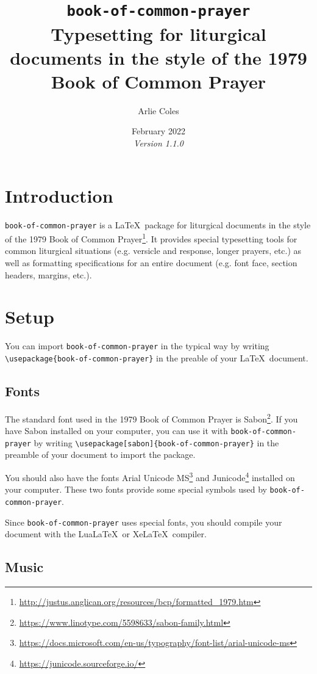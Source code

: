 \documentclass{article}
\title{\texttt{book-of-common-prayer}\\
	   \Large Typesetting for liturgical documents in the style of the 1979 Book of Common Prayer \\
	   }
\date{February 2022 \\ \textit{Version 1.1.0}}
\author{Arlie Coles}
\begin{document}
\maketitle

\tableofcontents

\clearpage
\section{Introduction}

\texttt{book-of-common-prayer} is a \LaTeX\ package for liturgical documents in the style of the 1979 Book of Common Prayer\footnote{\url{http://justus.anglican.org/resources/bcp/formatted_1979.htm}}. It provides special typesetting tools for common liturgical situations (e.g. versicle and response, longer prayers, etc.) as well as formatting specifications for an entire document (e.g. font face, section headers, margins, etc.).

\section{Setup}

You can import \texttt{book-of-common-prayer} in the typical way by writing \lstinline|\usepackage{book-of-common-prayer}| in the preable of your \LaTeX\ document.

\subsection{Fonts}

The standard font used in the 1979 Book of Common Prayer is Sabon\footnote{\url{https://www.linotype.com/5598633/sabon-family.html}}. If you have Sabon installed on your computer, you can use it with \texttt{book-of-common-prayer} by writing \lstinline|\usepackage[sabon]{book-of-common-prayer}| in the preamble of your document to import the package.

You should also have the fonts Arial Unicode MS\footnote{\url{https://docs.microsoft.com/en-us/typography/font-list/arial-unicode-ms}} and Junicode\footnote{\url{https://junicode.sourceforge.io/}} installed on your computer. These two fonts provide some special symbols used by \texttt{book-of-common-prayer}.

Since \texttt{book-of-common-prayer} uses special fonts, you should compile your document with the Lua\LaTeX\ or Xe\LaTeX\ compiler.

\subsection{Music}
\end{document}
